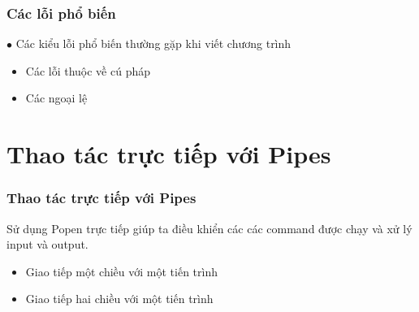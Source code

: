 \documentclass{beamer}
\begin{document}
\begin{frame}[label=error]
\frametitle{Các lỗi phổ biến}
$\bullet$ Các kiểu lỗi phổ biến thường gặp khi viết chương trình
\begin{itemize}
\item Các lỗi thuộc về cú pháp
\item Các ngoại lệ
\end{itemize}
\end{frame}

\section{Thao tác trực tiếp với Pipes}
\begin{frame}[label=pipe]
\frametitle{Thao tác trực tiếp với Pipes}
Sử dụng Popen trực tiếp giúp ta điều khiển các các command được chạy và xử lý input và output.  

\begin{itemize}
\item Giao tiếp một chiều với một tiến trình
\item Giao tiếp hai chiều với một tiến trình
\end{itemize}
\hyperlink{teptin}{}
\end{frame}





\end{document}
